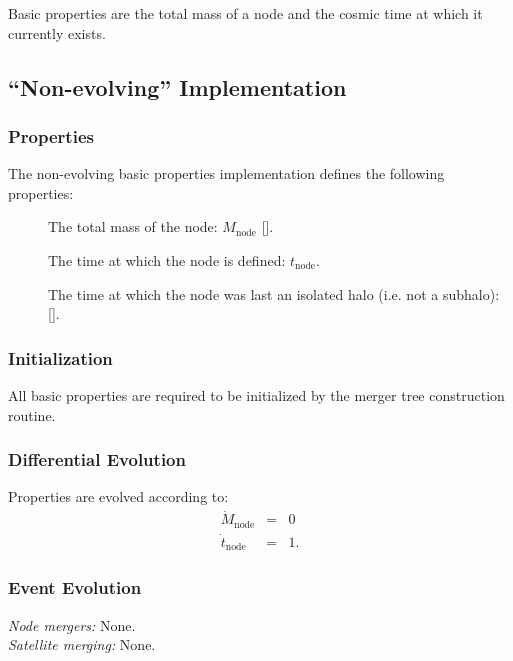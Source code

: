 Basic properties are the total mass of a \gls{node} and the cosmic time at which it currently exists.

\subsection{``Non-evolving'' Implementation}

\subsubsection{Properties}

The non-evolving basic properties implementation defines the following properties:
\begin{description}
 \item [] The total mass of the node: $M_\mathrm{node}$ [].
 \item [] The time at which the \gls{node} is defined: $t_\mathrm{node}$.
 \item [] The time at which the \gls{node} was last an isolated halo (i.e. not a subhalo): [].
\end{description}

\subsubsection{Initialization}

All basic properties are required to be initialized by the merger tree construction routine.

\subsubsection{Differential Evolution}

Properties are evolved according to:
\begin{eqnarray}
 \dot{M}_\mathrm{node} &=& 0 \\
 \dot{t}_\mathrm{node} &=& 1.
\end{eqnarray}

\subsubsection{Event Evolution}

\noindent\emph{Node mergers:} None.\\

\noindent\emph{Satellite merging:} None.\\

